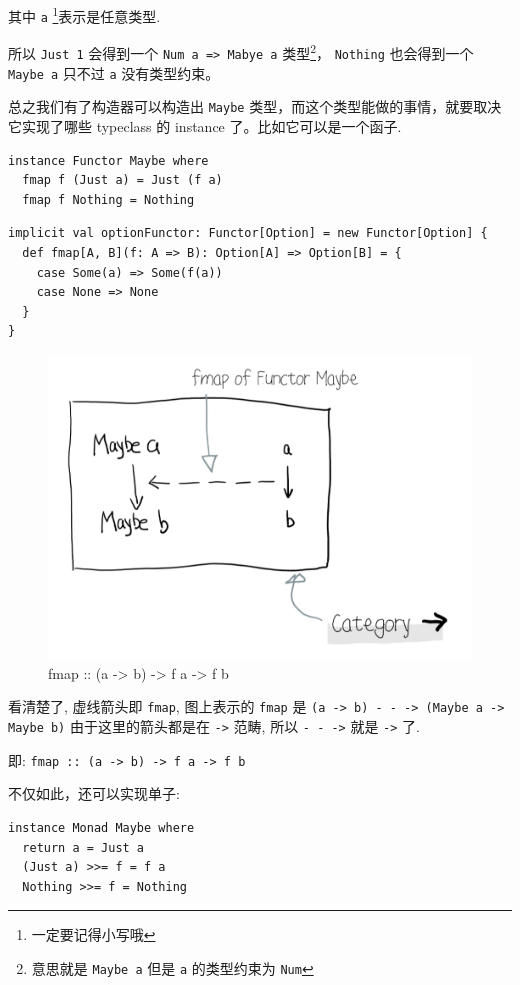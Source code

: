 \documentclass[11pt]{tufte-book}
\begin{document}
其中 \texttt{a} \footnote{一定要记得小写哦}表示是任意类型.

所以 \texttt{Just 1} 会得到一个 \texttt{Num a => Mabye a} 类型\footnote{意思就是 \texttt{Maybe a} 但是 \texttt{a} 的类型约束为 \texttt{Num}}，
\texttt{Nothing} 也会得到一个 \texttt{Maybe a} 只不过 \texttt{a} 没有类型约束。

总之我们有了构造器可以构造出 \texttt{Maybe} 类型，而这个类型能做的事情，就要取决它实现了哪些 typeclass 的 instance 了。比如它可以是一个函子.
\begin{verbatim}
instance Functor Maybe where
  fmap f (Just a) = Just (f a)
  fmap f Nothing = Nothing
\end{verbatim}

\begin{verbatim}
implicit val optionFunctor: Functor[Option] = new Functor[Option] {
  def fmap[A, B](f: A => B): Option[A] => Option[B] = {
    case Some(a) => Some(f(a))
    case None => None
  }
}
\end{verbatim}

\begin{figure}[htbp]
\centering
\includegraphics[width=.9\linewidth]{images/p2-maybe-functor.png}
\caption{fmap :: (a -> b) -> f a -> f b}
\end{figure}

看清楚了, 虚线箭头即 \texttt{fmap}, 图上表示的 \texttt{fmap} 是 \texttt{(a -> b) - - -> (Maybe a -> Maybe b)} 由于这里的箭头都是在 \texttt{->} 范畴, 所以 \texttt{- - ->} 就是 \texttt{->} 了.

即: \texttt{fmap :: (a -> b) -> f a -> f b}

不仅如此，还可以实现单子:
\begin{verbatim}
instance Monad Maybe where
  return a = Just a
  (Just a) >>= f = f a
  Nothing >>= f = Nothing
\end{verbatim}
\end{document}
